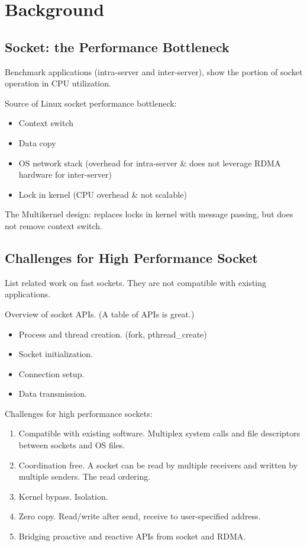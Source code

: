 \section{Background}
\label{sec:background}

\subsection{Socket: the Performance Bottleneck}

Benchmark applications (intra-server and inter-server), show the portion of socket operation in CPU utilization.

Source of Linux socket performance bottleneck:
\begin{itemize}
	\item Context switch
	\item Data copy
	\item OS network stack (overhead for intra-server \& does not leverage RDMA hardware for inter-server)
	\item Lock in kernel (CPU overhead \& not scalable)
\end{itemize}

The Multikernel design: replaces locks in kernel with message passing, but does not remove context switch.

\subsection{Challenges for High Performance Socket}

List related work on fast sockets. They are not compatible with existing applications.

Overview of socket APIs. (A table of APIs is great.)
\begin{itemize}
	\item Process and thread creation. (fork, pthread\_create)
	\item Socket initialization.
	\item Connection setup.
	\item Data transmission.
\end{itemize}

Challenges for high performance sockets:
\begin{enumerate}
	\item Compatible with existing software. Multiplex system calls and file descriptors between sockets and OS files.
	\item Coordination free. A socket can be read by multiple receivers and written by multiple senders. The read ordering.
	\item Kernel bypass. Isolation.
	\item Zero copy. Read/write after send, receive to user-specified address.
	\item Bridging proactive and reactive APIs from socket and RDMA.
\end{enumerate}
